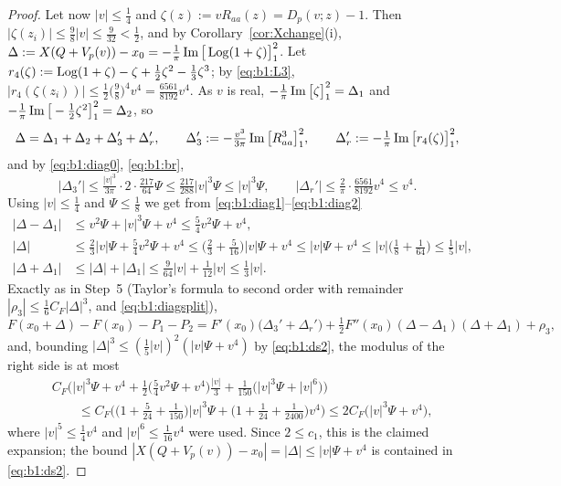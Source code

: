 \begin{proof}
Let now $|v|\le\frac14$ and $\zeta(z):=vR_{aa}(z)=D_p(v;z)-1$. Then $|\zeta(z_i)|\le\frac98|v|\le\frac9{32}<\frac12$, and by Corollary~\ref{cor:Xchange}(i),
$\Delta:=X(Q+V_p(v))-x_0=-\frac1\pi\operatorname{Im}\big[\operatorname{Log}(1+\zeta)\big]_{1}^{2}$. Let $r_4(\zeta):=\operatorname{Log}(1+\zeta)-\zeta+\frac12\zeta^2-\frac13\zeta^3$; by \eqref{eq:b1:L3},
$|r_4(\zeta(z_i))|\le\frac12\big(\frac98\big)^4v^4=\frac{6561}{8192}v^4$. As $v$ is real, $-\frac1\pi\operatorname{Im}\big[\zeta\big]_{1}^{2}=\Delta_1$ and $-\frac1\pi\operatorname{Im}\big[-\frac12\zeta^2\big]_{1}^{2}=\Delta_2$, so
\begin{equation}\label{eq:b1:diagsplit}
\Delta=\Delta_1+\Delta_2+\Delta_3'+\Delta_r',\qquad\Delta_3':=-\tfrac{v^3}{3\pi}\operatorname{Im}\big[R_{aa}^3\big]_{1}^{2},\qquad\Delta_r':=-\tfrac1\pi\operatorname{Im}\big[r_4(\zeta)\big]_{1}^{2},
\end{equation}
and by \eqref{eq:b1:diag0}, \eqref{eq:b1:br},
\begin{equation}\label{eq:b1:diag2}
|\Delta_3'|\le\tfrac{|v|^3}{3\pi}\cdot2\cdot\tfrac{217}{64}\Psi\le\tfrac{217}{288}|v|^3\Psi\le|v|^3\Psi,\qquad|\Delta_r'|\le\tfrac2\pi\cdot\tfrac{6561}{8192}v^4\le v^4 .
\end{equation}
Using $|v|\le\frac14$ and $\Psi\le\frac18$ we get from \eqref{eq:b1:diag1}--\eqref{eq:b1:diag2}
\begin{align}
|\Delta-\Delta_1|&\le v^2\Psi+|v|^3\Psi+v^4\le\tfrac54v^2\Psi+v^4,\label{eq:b1:ds1}\\
|\Delta|&\le\tfrac23|v|\Psi+\tfrac54v^2\Psi+v^4\le\big(\tfrac23+\tfrac5{16}\big)|v|\Psi+v^4\le|v|\Psi+v^4\le|v|\big(\tfrac18+\tfrac1{64}\big)\le\tfrac15|v|,\label{eq:b1:ds2}\\
|\Delta+\Delta_1|&\le|\Delta|+|\Delta_1|\le\tfrac9{64}|v|+\tfrac1{12}|v|\le\tfrac13|v| .\label{eq:b1:ds3}
\end{align}
Exactly as in Step~5 (Taylor's formula to second order with remainder $|\rho_3|\le\frac16C_F|\Delta|^3$, and \eqref{eq:b1:diagsplit}),
\[
F(x_0+\Delta)-F(x_0)-P_1-P_2=F'(x_0)\big(\Delta_3'+\Delta_r'\big)+\tfrac12F''(x_0)(\Delta-\Delta_1)(\Delta+\Delta_1)+\rho_3 ,
\]
and, bounding $|\Delta|^3\le(\frac15|v|)^2(|v|\Psi+v^4)$ by \eqref{eq:b1:ds2}, the modulus of the right side is at most
\begin{align*}
&C_F\Big(|v|^3\Psi+v^4+\tfrac12\big(\tfrac54v^2\Psi+v^4\big)\tfrac{|v|}3+\tfrac1{150}\big(|v|^3\Psi+|v|^6\big)\Big)\\
&\qquad\le C_F\Big(\big(1+\tfrac5{24}+\tfrac1{150}\big)|v|^3\Psi+\big(1+\tfrac1{24}+\tfrac1{2400}\big)v^4\Big)\le2C_F\big(|v|^3\Psi+v^4\big),
\end{align*}
where $|v|^5\le\frac14v^4$ and $|v|^6\le\frac1{16}v^4$ were used. Since $2\le c_1$, this is the claimed expansion; the bound
$|X(Q+V_p(v))-x_0|=|\Delta|\le|v|\Psi+v^4$ is contained in \eqref{eq:b1:ds2}.
\end{proof}

